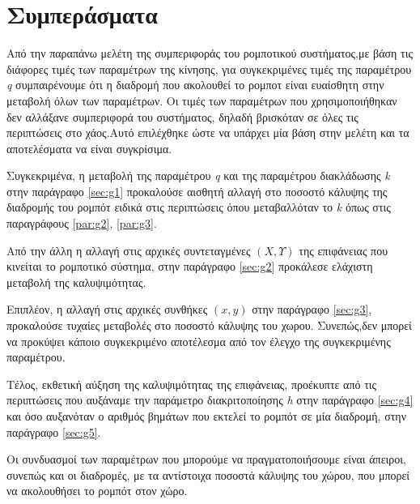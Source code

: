 \section{Συμπεράσματα}

Από την παραπάνω μελέτη της συμπεριφοράς του ρομποτικού συστήματος,με βάση τις διάφορες τιμές των παραμέτρων της κίνησης, για συγκεκριμένες τιμές της παραμέτρου \emph{q} συμπαιρένουμε ότι η διαδρομή που ακολουθεί το ρομποτ είναι ευαίσθητη στην μεταβολή όλων των παραμέτρων. Οι τιμές των παραμέτρων που χρησιμοποιήθηκαν δεν αλλάξανε συμπεριφορά του συστήματος, δηλαδή βρισκόταν σε όλες τις περιπτώσεις στο χάος.Αυτό επιλέχθηκε ώστε να υπάρχει μία βάση στην μελέτη και τα αποτελέσματα να είναι συγκρίσιμα.
 
Συγκεκριμένα, η μεταβολή της παραμέτρου \emph{q} και της παραμέτρου διακλάδωσης \emph{k} στην παράγραφο \ref{sec:g1} προκαλούσε αισθητή αλλαγή στο ποσοστό κάλυψης της διαδρομής του ρομπότ ειδικά στις περιπτώσεις όπου μεταβαλλόταν το \emph{k} όπως στις παραγράφους \ref{par:g2}, \ref{par:g3}.

Aπό την άλλη η αλλαγή στις αρχικές συντεταγμένες $(Χ,Υ)$ της επιφάνειας που κινείται το ρομποτικό σύστημα, στην παράγραφο \ref{sec:g2} προκάλεσε ελάχιστη μεταβολή της καλυψιμότητας.

Επιπλέον, η αλλαγή στις αρχικές  συνθήκες $(x,y)$ στην παράγραφο \ref{sec:g3}, προκαλούσε τυχαίες μεταβολές στο ποσοστό κάλυψης του χωρου. Συνεπώς,δεν μπορεί να προκύψει κάποιο συγκεκριμένο αποτέλεσμα από τον έλεγχο της συγκεκριμένης παραμέτρου.

Τέλος, εκθετική αύξηση της καλυψιμότητας της επιφάνειας, προέκυπτε
από τις περιπτώσεις που αυξάναμε την παράμετρο διακριτοποίησης \emph{h} στην παράγραφο \ref{sec:g4} και όσο αυξανόταν ο αριθμός βημάτων που εκτελεί το ρομπότ σε μία διαδρομή, στην παράγραφο \ref{sec:g5}.

Οι συνδυασμοί των παραμέτρων που μπορούμε να πραγματοποιήσουμε είναι άπειροι, συνεπώς και οι διαδρομές, με τα αντίστοιχα ποσοστά κάλυψης του χώρου, που μπορεί να ακολουθήσει το ρομπότ στον χώρο.